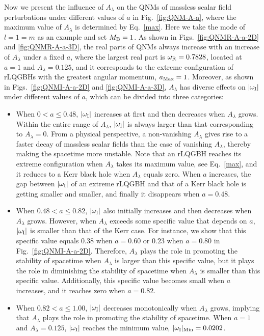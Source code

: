 \documentclass[12pt]{article}
\begin{document}
Now we present the influence of $A_\lambda$ on the QNMs of massless scalar field perturbations under different values of $a$ in Fig.~\ref{fig:QNM-A-a}, where the maximum value of $A_\lambda$ is determined by Eq.~\eqref{max}.
Here we take the mode of  $l=1=m$ as an example and set $M_{\rm B}=1$.
As shown in Figs.~\ref{fig:QNMR-A-a-2D} and \ref{fig:QNMR-A-a-3D}, the real parts of QNMs always increase with an increase of $A_\lambda$ under a fixed $a$, where
the largest real part is $\omega_{\rm R}=0.7828$, located at $a=1$ and $A_\lambda=0.125$, and it corresponds to the extreme configuration of rLQGBHs with the greatest angular momentum, $a_{\rm Max}=1$.
Moreover, as shown in Figs.~\ref{fig:QNMI-A-a-2D} and \ref{fig:QNMI-A-a-3D}, $A_\lambda$ has diverse effects on $|\omega_{\rm I}|$ under different values of $a$, which can be divided into three categories:
\begin{itemize}
    \item When $0<a\leq0.48$, $|\omega_{\rm I}|$ increases at first and then decreases when $A_\lambda$ grows. 
    Within the entire range of $A_\lambda$, $|\omega_{\rm I}|$ is always larger than that corresponding to $A_\lambda=0$. 
    From a physical perspective, a non-vanishing $A_\lambda$ gives rise to a faster decay of massless scalar fields than the case of  vanishing $A_\lambda$, thereby making the spacetime more unstable.
    Note that an rLQGBH reaches its  extreme configuration when $A_\lambda$ takes its maximum value, see Eq.~\eqref{max}, and it reduces to a Kerr black hole when $A_\lambda$ equals zero. 
    When $a$ increases, the gap between $|\omega_{\rm I}|$ of an extreme rLQGBH and that of a Kerr black hole is getting smaller and smaller, and finally it disappears when $a=0.48$.
    \item When $0.48<a\leq0.82$, $|\omega_{\rm I}|$ also initially increases and then  decreases when $A_\lambda$ grows. 
    However, when $A_\lambda$ exceeds some specific value that depends on $a$, $|\omega_{\rm I}|$ is smaller than that of the Kerr case. For instance,
    we show that this specific value equals $0.38$ when $a=0.60$ or $0.23$ when $a=0.80$ in Fig.~\ref{fig:QNMI-A-a-2D}.
    Therefore, $A_\lambda$ plays the role in promoting the stability of spacetime when $A_\lambda$ is larger than this specific value,
    but it plays the role in diminishing the stability of spacetime when $A_\lambda$ is smaller than this specific value.
    Additionally, this specific value becomes small when $a$ increases, and it reaches zero when $a=0.82$.
    
    \item When $0.82<a\leq1.00$, $|\omega_{\rm I}|$ decreases monotonically when $A_\lambda$ grows, implying that
    $A_\lambda$ plays the role in promoting the stability of spacetime.
     When $a=1$ and $A_\lambda=0.125$, $|\omega_{\rm I}|$ reaches the minimum value, $|\omega_{\rm I}|_{\rm Min}=0.0202$.
\end{itemize}
\end{document}
